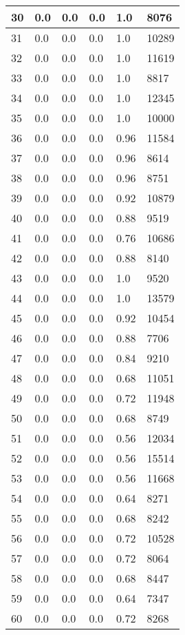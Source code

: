 \begin{longtable}{|l|l|l|l|l|l|}
30 & 0.0 & 0.0 & 0.0 & 1.0 & 8076 \\ \hline 
31 & 0.0 & 0.0 & 0.0 & 1.0 & 10289 \\ \hline 
32 & 0.0 & 0.0 & 0.0 & 1.0 & 11619 \\ \hline 
33 & 0.0 & 0.0 & 0.0 & 1.0 & 8817 \\ \hline 
34 & 0.0 & 0.0 & 0.0 & 1.0 & 12345 \\ \hline 
35 & 0.0 & 0.0 & 0.0 & 1.0 & 10000 \\ \hline 
36 & 0.0 & 0.0 & 0.0 & 0.96 & 11584 \\ \hline 
37 & 0.0 & 0.0 & 0.0 & 0.96 & 8614 \\ \hline 
38 & 0.0 & 0.0 & 0.0 & 0.96 & 8751 \\ \hline 
39 & 0.0 & 0.0 & 0.0 & 0.92 & 10879 \\ \hline 
40 & 0.0 & 0.0 & 0.0 & 0.88 & 9519 \\ \hline 
41 & 0.0 & 0.0 & 0.0 & 0.76 & 10686 \\ \hline 
42 & 0.0 & 0.0 & 0.0 & 0.88 & 8140 \\ \hline 
43 & 0.0 & 0.0 & 0.0 & 1.0 & 9520 \\ \hline 
44 & 0.0 & 0.0 & 0.0 & 1.0 & 13579 \\ \hline 
45 & 0.0 & 0.0 & 0.0 & 0.92 & 10454 \\ \hline 
46 & 0.0 & 0.0 & 0.0 & 0.88 & 7706 \\ \hline 
47 & 0.0 & 0.0 & 0.0 & 0.84 & 9210 \\ \hline 
48 & 0.0 & 0.0 & 0.0 & 0.68 & 11051 \\ \hline 
49 & 0.0 & 0.0 & 0.0 & 0.72 & 11948 \\ \hline 
50 & 0.0 & 0.0 & 0.0 & 0.68 & 8749 \\ \hline 
51 & 0.0 & 0.0 & 0.0 & 0.56 & 12034 \\ \hline 
52 & 0.0 & 0.0 & 0.0 & 0.56 & 15514 \\ \hline 
53 & 0.0 & 0.0 & 0.0 & 0.56 & 11668 \\ \hline 
54 & 0.0 & 0.0 & 0.0 & 0.64 & 8271 \\ \hline 
55 & 0.0 & 0.0 & 0.0 & 0.68 & 8242 \\ \hline 
56 & 0.0 & 0.0 & 0.0 & 0.72 & 10528 \\ \hline 
57 & 0.0 & 0.0 & 0.0 & 0.72 & 8064 \\ \hline 
58 & 0.0 & 0.0 & 0.0 & 0.68 & 8447 \\ \hline 
59 & 0.0 & 0.0 & 0.0 & 0.64 & 7347 \\ \hline 
60 & 0.0 & 0.0 & 0.0 & 0.72 & 8268 \\ \hline 

\end{longtable}
